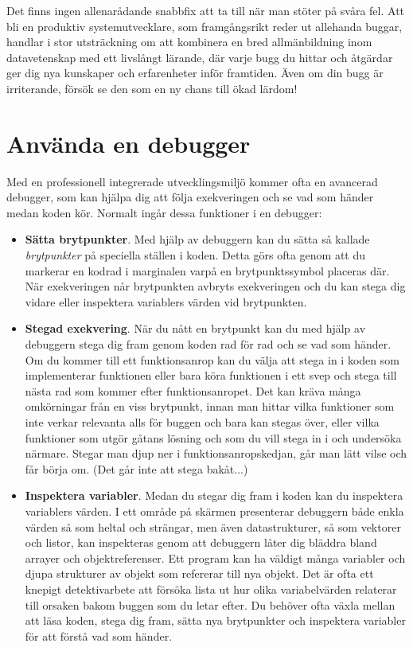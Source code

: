 Det finns ingen allenarådande snabbfix att ta till när man stöter på svåra fel. Att bli en produktiv  systemutvecklare, som framgångsrikt reder ut allehanda buggar, handlar i stor utsträckning om att kombinera en bred allmänbildning inom datavetenskap med ett livslångt lärande, där varje bugg du hittar och åtgärdar ger dig nya kunskaper och erfarenheter inför framtiden.
Även om din bugg är irriterande, försök se den som en ny chans till ökad lärdom!



\section{Använda en debugger}\label{section:debugging}

Med en professionell integrerade utvecklingsmiljö kommer ofta en avancerad debugger, som kan hjälpa dig att följa exekveringen och se vad som händer medan koden kör. Normalt ingår dessa funktioner i en debugger: 

\begin{itemize}
\item \textbf{Sätta brytpunkter}. Med hjälp av debuggern kan du sätta så kallade \textit{brytpunkter} på speciella ställen i koden. Detta görs ofta genom att du markerar en kodrad i marginalen varpå en brytpunktssymbol placeras där. När exekveringen når brytpunkten avbryts exekveringen och du kan stega dig vidare eller inspektera variablers värden vid brytpunkten.  
\item \textbf{Stegad exekvering}. När du nått en brytpunkt kan du med hjälp av debuggern stega dig fram genom koden rad för rad och se vad som händer. Om du kommer till ett funktionsanrop kan du välja att stega in i koden som implementerar funktionen eller bara köra funktionen i ett svep och stega till nästa rad som kommer efter funktionsanropet. Det kan kräva många omkörningar från en viss brytpunkt, innan man hittar vilka funktioner som inte verkar relevanta alls för buggen och bara kan stegas över, eller vilka funktioner som utgör gåtans lösning och som du vill stega in i och undersöka närmare.  Stegar man djup ner i funktionsanropskedjan, går man lätt vilse och får börja om. (Det går inte att stega bakåt...)
 
\item \textbf{Inspektera variabler}. Medan du stegar dig fram i koden kan du inspektera variablers värden. I ett område på skärmen presenterar debuggern både enkla värden så som heltal och strängar, men även datastrukturer, så som vektorer och listor, kan inspekteras genom att debuggern låter dig bläddra bland arrayer och objektreferenser. Ett program kan ha väldigt många variabler och djupa strukturer av objekt som refererar till nya objekt. Det är ofta ett knepigt detektivarbete att försöka lista ut hur olika variabelvärden relaterar till orsaken bakom buggen som du letar efter. Du behöver ofta växla mellan att läsa koden, stega dig fram, sätta nya brytpunkter och inspektera variabler för att förstå vad som händer. 

\end{itemize}

